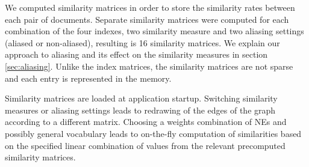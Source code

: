 We computed similarity matrices in order to store the similarity rates between each pair of documents. Separate similarity matrices were computed for each combination of the four indexes, two similarity measure and two aliasing settings (aliased or non-aliased), resulting is 16 similarity matrices. We explain our approach to aliasing and its effect on the similarity measures in section \ref{sec:aliasing}. Unlike the index matrices, the similarity matrices are not sparse and each entry is represented in the memory.

Similarity matrices are loaded at application startup. Switching similarity measures or aliasing settings leads to redrawing of the edges of the graph according to a different matrix. Choosing a weights combination of NEs and possibly general vocabulary leads to on-the-fly computation of similarities based on the specified linear combination of values from the relevant precomputed similarity matrices.



